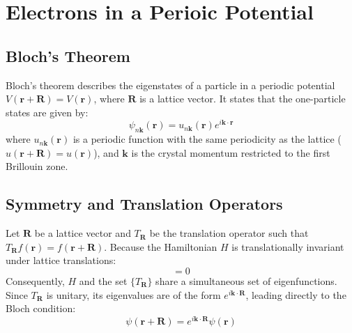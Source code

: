 \documentclass[10pt, a4paper]{article}
\begin{document}
\section{Electrons in a Perioic Potential}

\subsection{Bloch's Theorem}
Bloch's theorem describes the eigenstates of a particle in a periodic potential $V(\mathbf{r} + \mathbf{R}) = V(\mathbf{r})$, where $\mathbf{R}$ is a lattice vector. It states that the one-particle states are given by:
\begin{equation}
    \psi_{n\mathbf{k}}(\mathbf{r}) = u_{n\mathbf{k}}(\mathbf{r}) e^{i\mathbf{k}\cdot\mathbf{r}}
\end{equation}
where $u_{n\mathbf{k}}(\mathbf{r})$ is a periodic function with the same periodicity as the lattice ($u(\mathbf{r} + \mathbf{R}) = u(\mathbf{r})$), and $\mathbf{k}$ is the crystal momentum restricted to the first Brillouin zone.

\subsection{Symmetry and Translation Operators}
Let $\mathbf{R}$ be a lattice vector and $T_\mathbf{R}$ be the translation operator such that $T_\mathbf{R}f(\mathbf{r}) = f(\mathbf{r+R})$. Because the Hamiltonian $H$ is translationally invariant under lattice translations:
\begin{equation}
    [T_\mathbf{R}, H] = 0
\end{equation} 
Consequently, $H$ and the set $\{T_\mathbf{R}\}$ share a simultaneous set of eigenfunctions. Since $T_\mathbf{R}$ is unitary, its eigenvalues are of the form $e^{i\mathbf{k}\cdot\mathbf{R}}$, leading directly to the Bloch condition:
\begin{equation}
    \psi(\mathbf{r} + \mathbf{R}) = e^{i\mathbf{k}\cdot\mathbf{R}} \psi(\mathbf{r})
\end{equation}
\end{document}
